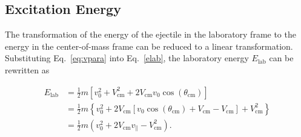 \subsection{Excitation Energy}
The transformation of the energy of the ejectile in the laboratory frame to the energy in the center-of-mass frame can be reduced to a linear transformation.  Substituting Eq.~\ref{eq:vpara} into Eq.~\ref{elab}, the laboratory energy $E_\mathrm{lab}$ can be rewritten as

\begin{equation}
\begin{split}
E_\mathrm{lab}&=\frac{1}{2} m\left[v_0^2+V_\mathrm{cm}^2 +2V_\mathrm{cm}v_0 \cos(\theta_\mathrm{cm})\right]\\
&=\frac{1}{2} m\left\{v_0^2+2V_\mathrm{cm}[v_0 \cos(\theta_\mathrm{cm})+V_\mathrm{cm}-V_\mathrm{cm}]+V_\mathrm{cm}^2 \right\}\\
&=\frac{1}{2} m\left(v_0^2+2V_\mathrm{cm}v_\parallel -V_\mathrm{cm}^2\right).
\end{split}
\label{elab_of_vpara}
\end{equation}

